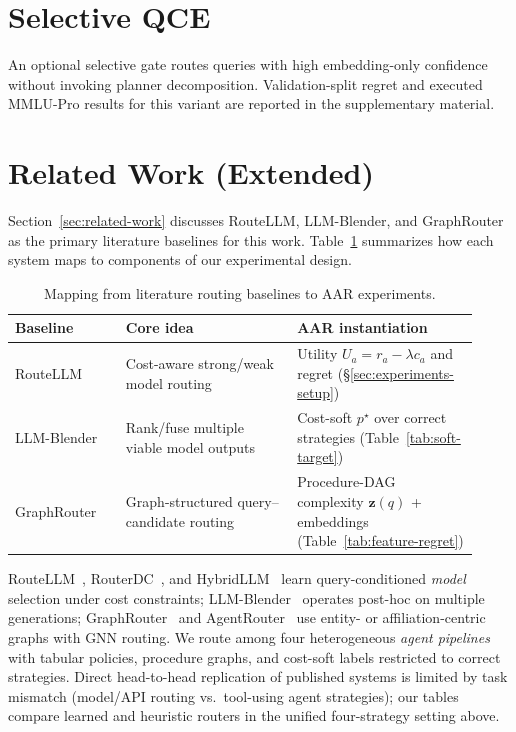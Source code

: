 \section{Selective QCE}
\label{app:selective}

An optional selective gate routes queries with high embedding-only confidence without
invoking planner decomposition.
Validation-split regret and executed MMLU-Pro results for this variant are reported in the
supplementary material.

\section{Related Work (Extended)}
\label{app:related-extended}

Section~\ref{sec:related-work} discusses RouteLLM, LLM-Blender, and GraphRouter as the
primary literature baselines for this work.
Table~\ref{tab:related-mapping} summarizes how each system maps to components of our
experimental design.

\begin{table}[h]
  \centering
  \footnotesize
  \caption{Mapping from literature routing baselines to AAR experiments.}
  \label{tab:related-mapping}
  \begin{tabular}{@{}p{0.22\linewidth}p{0.34\linewidth}p{0.36\linewidth}@{}}
    \toprule
    Baseline & Core idea & AAR instantiation \\
    \midrule
    RouteLLM &
      Cost-aware strong/weak model routing &
      Utility $U_a=r_a-\lambda c_a$ and regret (§\ref{sec:experiments-setup}) \\
    LLM-Blender &
      Rank/fuse multiple viable model outputs &
      Cost-soft $p^\star$ over correct strategies (Table~\ref{tab:soft-target}) \\
    GraphRouter &
      Graph-structured query--candidate routing &
      Procedure-DAG complexity $\mathbf{z}(q)$ + embeddings (Table~\ref{tab:feature-regret}) \\
    \bottomrule
  \end{tabular}
\end{table}

RouteLLM~\citep{ong2025routellm}, RouterDC~\citep{chen2024routerdc}, and HybridLLM~\citep{ding2024hybridllm} learn query-conditioned \emph{model} selection under
cost constraints; LLM-Blender~\citep{jiang2023llmblender} operates post-hoc on multiple generations; GraphRouter~\citep{feng2025graphrouter} and
AgentRouter~\citep{zhang2025agentrouter} use entity- or affiliation-centric graphs with GNN routing.
We route among four heterogeneous \emph{agent pipelines} with tabular policies, procedure
graphs, and cost-soft labels restricted to correct strategies.
Direct head-to-head replication of published systems is limited by task mismatch (model/API
routing vs.\ tool-using agent strategies); our tables compare learned and heuristic routers
in the unified four-strategy setting above.

